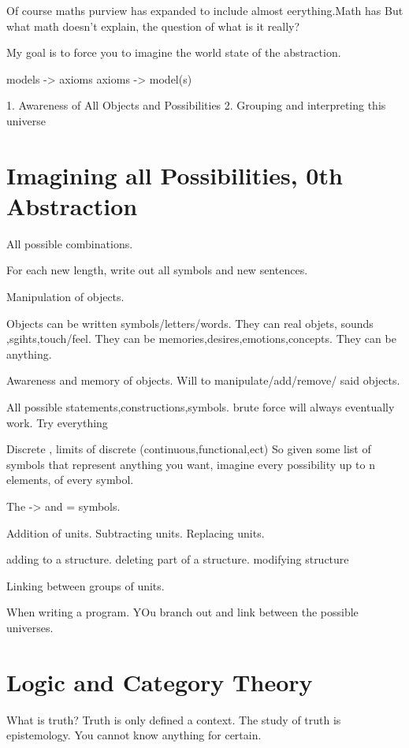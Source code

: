 \documentclass{book}
\begin{document}
Of course maths purview has expanded to include almost eerything.Math has 
But what math doesn't explain, the question of what is it really?




My goal is to force you to imagine the world state of the abstraction. 

models -> axioms
axioms -> model(s)

1. Awareness of All Objects and Possibilities
2. Grouping and interpreting  this universe



\chapter{Imagining all Possibilities, 0th Abstraction}
All possible combinations.

For each new length, write out all symbols and new sentences.



Manipulation of objects.

Objects can be written symbols/letters/words.
They can real objets, sounds ,sgihts,touch/feel.
They can be memories,desires,emotions,concepts.
They can be anything. 

Awareness and memory of objects.
Will to manipulate/add/remove/  said objects. 


All possible statements,constructions,symbols.
brute force will always eventually work.
Try everything

Discrete , limits of discrete (continuous,functional,ect)
So given some list of symbols that represent anything you want, imagine every possibility up to n elements, of every symbol.


The -> and = symbols. 

Addition of units.
Subtracting units.
Replacing units. 

adding to a structure.
deleting part of a structure.
modifying structure

Linking between groups of units.

When writing a program. YOu branch out and link between the possible universes. 


\chapter{Logic and Category Theory}
What is truth?
Truth is only defined a context.
The study of truth is epistemology. 
You cannot know anything for certain. 
\end{document}
